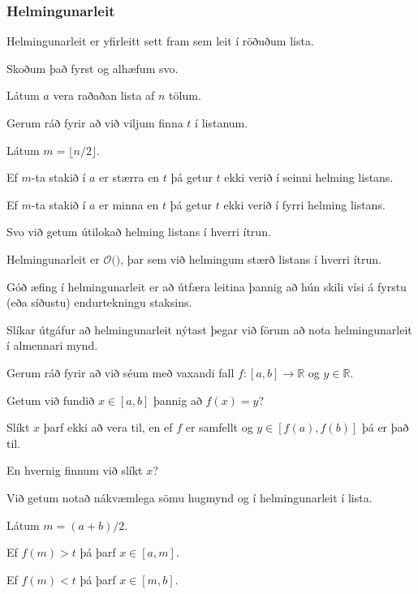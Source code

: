 {
    \frametitle{Helmingunarleit}
    {
        \item<1-> Helmingunarleit er yfirleitt sett fram sem leit í röðuðum lista.
        \item<2-> Skoðum það fyrst og alhæfum svo.
        \item<3-> Látum $a$ vera raðaðan lista af $n$ tölum.
        \item<4-> Gerum ráð fyrir að við viljum finna $t$ í listanum.
        \item<5-> Látum $m = \lfloor n/2 \rfloor$.
        \item<6-> Ef $m$-ta stakið í $a$ er stærra en $t$ þá getur $t$ ekki verið í seinni helming listans.
        \item<7-> Ef $m$-ta stakið í $a$ er minna en $t$ þá getur $t$ ekki verið í fyrri helming listans.
        \item<8-> Svo við getum útilokað helming listans í hverri ítrun.
    }
}

{
}

{
    {
        \item<1-> Helmingunarleit er $\mathcal{O}($$)$, þar sem við helmingum stærð listans í hverri ítrun.
        \item<3-> Góð æfing í helmingunarleit er að útfæra leitina þannig að hún skili vísi á fyrstu (eða síðustu)  endurtekningu staksins.
        \item<4-> Slíkar útgáfur að helmingunarleit nýtast þegar við förum að nota helmingunarleit í almennari mynd.
    }
}

{
    {
        \item<1-> Gerum ráð fyrir að við séum með vaxandi fall $f \colon [a, b] \rightarrow \mathbb{R}$ og $y \in \mathbb{R}$.
        \item<2-> Getum við fundið $x \in [a, b]$ þannig að $f(x) = y$?
        \item<3-> Slíkt $x$ þarf ekki að vera til, en ef $f$ er samfellt og $y \in [f(a), f(b)]$ þá er það til.
        \item<4-> En hvernig finnum við slíkt $x$?
        \item<5-> Við getum notað nákvæmlega sömu hugmynd og í helmingunarleit í lista.
        \item<6-> Látum $m = (a + b)/2$.
        \item<7-> Ef $f(m) > t$ þá þarf $x \in [a, m]$.
        \item<8-> Ef $f(m) < t$ þá þarf $x \in [m, b]$.
    }
}

